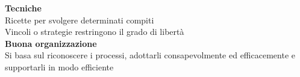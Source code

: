 \documentclass{article}
\begin{document}
		\textbf{Tecniche}\\
		Ricette per svolgere determinati compiti\\
		Vincoli o strategie restringono il grado di libertà\\
		
		\textbf{Buona organizzazione}\\
		Si basa sul riconoscere i processi, adottarli consapevolmente ed efficacemente e supportarli in modo efficiente\\
		

		
\end{document}

